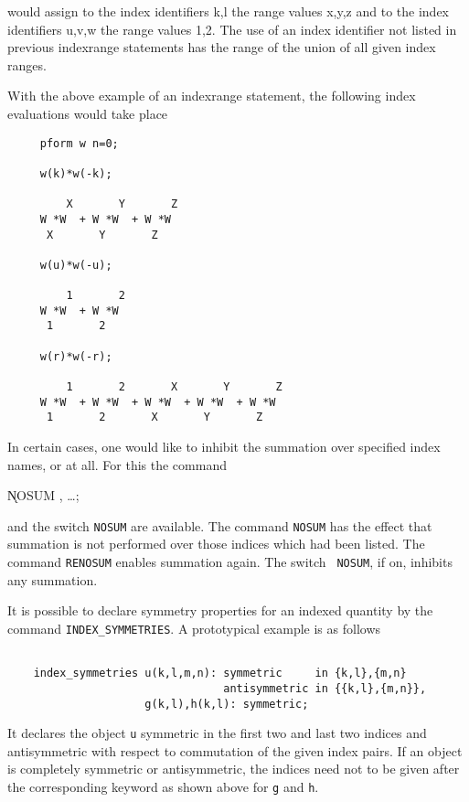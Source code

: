 would assign to the index identifiers k,l the range values x,y,z and
to the index identifiers u,v,w the range values 1,2. The use of an
index identifier not listed in previous indexrange statements has the
range of the union of all given index ranges.

With the above example of an indexrange statement, the following
index evaluations would take place

\begin{verbatim}
     pform w n=0;
    
     w(k)*w(-k);

         X       Y       Z
     W *W  + W *W  + W *W
      X       Y       Z

     w(u)*w(-u);

         1       2
     W *W  + W *W
      1       2

     w(r)*w(-r);

         1       2       X       Y       Z
     W *W  + W *W  + W *W  + W *W  + W *W
      1       2       X       Y       Z
\end{verbatim}

In certain cases, one would like to inhibit the summation over
specified index names, or at all.  For this the command

\hspace*{2em} \k{NOSUM} , \ldots;\label{NOSUM}

and the switch {\tt NOSUM} are 
available.  The command {\tt NOSUM} has the effect that summation is
not performed over those indices which had been listed.  The command
{\tt RENOSUM}\label{RENOSUM} enables summation again.  The switch {\tt
NOSUM}, if on, inhibits any summation. 

\label{INDEXSYMMETRIES} 
It is possible to declare symmetry properties for an indexed quantity by 
the command {\tt INDEX\_SYMMETRIES}. A prototypical example is as
follows

\begin{verbatim}

    index_symmetries u(k,l,m,n): symmetric     in {k,l},{m,n}
                                 antisymmetric in {{k,l},{m,n}},
                     g(k,l),h(k,l): symmetric;

\end{verbatim}

It declares the object {\tt u} symmetric in the first two and last 
two indices and antisymmetric with respect to commutation of the given
index pairs. If an object is completely symmetric or antisymmetric,
the indices need not to be given after the corresponding keyword as
shown above for {\tt g} and {\tt h}.

